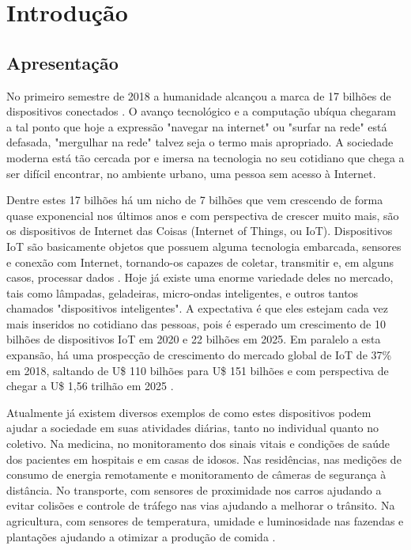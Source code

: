 \chapter{Introdução}

\section{Apresentação}

No primeiro semestre de 2018 a humanidade alcançou a marca de 17 bilhões de dispositivos conectados \cite{url_lueth2018_7BiIoT}. O avanço tecnológico e a computação ubíqua chegaram a tal ponto que hoje a expressão "navegar na internet" ou "surfar na rede" está defasada, "mergulhar na rede" talvez seja o termo mais apropriado. A sociedade moderna está tão cercada por e imersa na tecnologia no seu cotidiano que chega a ser difícil encontrar, no ambiente urbano, uma pessoa sem acesso à Internet.

Dentre estes 17 bilhões há um nicho de 7 bilhões que vem crescendo de forma quase exponencial nos últimos anos e com perspectiva de crescer muito mais, são os dispositivos de Internet das Coisas (Internet of Things, ou IoT). Dispositivos IoT são basicamente objetos que possuem alguma tecnologia embarcada, sensores e conexão com Internet, tornando-os capazes de coletar, transmitir e, em alguns casos, processar dados \cite{artigo_santos2016_IoTDaTeoriaAPratica}. Hoje já existe uma enorme variedade deles no mercado, tais como lâmpadas, geladeiras, micro-ondas inteligentes, e outros tantos chamados "dispositivos inteligentes". A expectativa é que eles estejam cada vez mais inseridos no cotidiano das pessoas, pois é esperado um crescimento de 10 bilhões de dispositivos IoT em 2020 e 22 bilhões em 2025. Em paralelo a esta expansão, há uma prospecção de crescimento do mercado global de IoT de 37\% em 2018, saltando de U\$ 110 bilhões para U\$ 151 bilhões e com perspectiva de chegar a U\$ 1,56 trilhão em 2025 \cite{url_lueth2018_7BiIoT}.

Atualmente já existem diversos exemplos de como estes dispositivos podem ajudar a sociedade em suas atividades diárias, tanto no individual quanto no coletivo. Na medicina, no monitoramento dos sinais vitais e condições de saúde dos pacientes em hospitais e em casas de idosos. Nas residências, nas medições de consumo de energia remotamente e monitoramento de câmeras de segurança à distância. No transporte, com sensores de proximidade nos carros ajudando a evitar colisões e controle de tráfego nas vias ajudando a melhorar o trânsito. Na agricultura, com sensores de temperatura, umidade e luminosidade nas fazendas e plantações ajudando a otimizar a produção de comida \cite{artigo_mancini2017_iotAplicacoes}.


